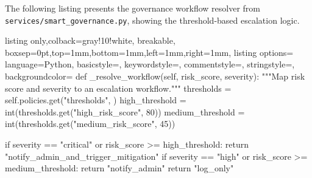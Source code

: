 The following listing presents the governance workflow resolver from \texttt{services/smart\_governance.py}, showing the threshold-based escalation logic.

\begin{tcblisting}{listing only,colback=gray!10!white, breakable, boxsep=0pt,top=1mm,bottom=1mm,left=1mm,right=1mm,
listing options={
language=Python,
basicstyle=\small\ttfamily,
keywordstyle=\color{blue},
commentstyle=\color{gray},
stringstyle=\color{orange},
backgroundcolor=\color{gray!25}}}
def _resolve_workflow(self, risk_score, severity):
    """Map risk score and severity to an escalation workflow."""
    thresholds = self.policies.get("thresholds", {})
    high_threshold   = int(thresholds.get("high_risk_score",   80))
    medium_threshold = int(thresholds.get("medium_risk_score", 45))

    if severity == "critical" or risk_score >= high_threshold:
        return "notify_admin_and_trigger_mitigation"
    if severity == "high" or risk_score >= medium_threshold:
        return "notify_admin"
    return "log_only"
\end{tcblisting}
